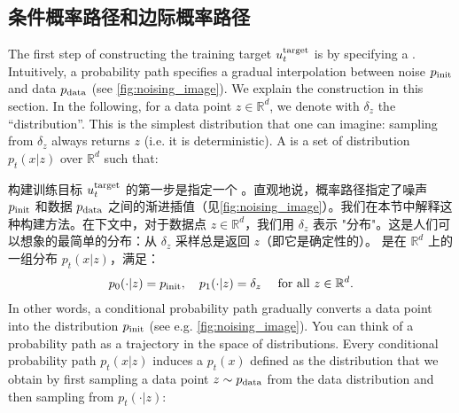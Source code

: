 \subsection{条件概率路径和边际概率路径}

The first step of constructing the training target $u^{\text{target}}_t$ is by specifying a . Intuitively, a probability path specifies a gradual interpolation between noise $p_{\rm{init}}$ and data $p_{\rm{data}}$ (see \cref{fig:noising_image}). We explain the construction in this section. In the following, for a data point $z\in\mathbb{R}^d$, we denote with $\delta_{z}$ the  ``distribution''. This is the simplest distribution that one can imagine: sampling from $\delta_{z}$ always returns $z$ (i.e. it is deterministic). A  is a set of distribution $p_t(x|z)$ over $\mathbb{R}^d$ such that:

构建训练目标 $u^{\text{target}}_t$ 的第一步是指定一个 。直观地说，概率路径指定了噪声 $p_{\rm{init}}$ 和数据 $p_{\rm{data}}$ 之间的渐进插值（见\cref{fig:noising_image}）。我们在本节中解释这种构建方法。在下文中，对于数据点 $z\in\mathbb{R}^d$，我们用 $\delta_{z}$ 表示  "分布"。这是人们可以想象的最简单的分布：从 $\delta_{z}$ 采样总是返回 $z$（即它是确定性的）。 是在 $\mathbb{R}^d$ 上的一组分布 $p_t(x|z)$，满足：
\begin{align}
\label{eq:interpolating_condition_conditional_path}
    p_0(\cdot|z)=p_{\rm{init}}, \quad p_1(\cdot|z)=\delta_{z}\quad \text{ for all }z\in\mathbb{R}^d.
\end{align}
In other words, a conditional probability path gradually converts a  data point into the distribution $p_{\rm{init}}$ (see e.g. \cref{fig:noising_image}). You can think of a probability path as a trajectory in the space of distributions. Every conditional probability path $p_t(x|z)$ induces a  $p_t(x)$ defined as the distribution that we obtain by first sampling a data point $z\sim p_{\rm{data}}$ from the data distribution and then sampling from $p_t(\cdot|z)$:

